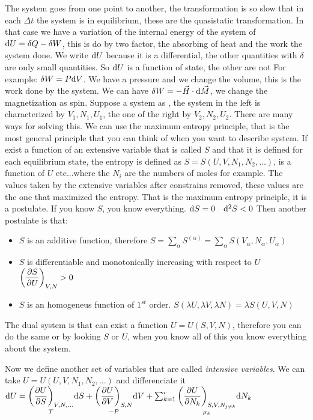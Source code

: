 \documentclass[../main/main.tex]{subfiles}
\begin{document}
The system goes from one point to another, the transformation is so slow that in each $\Delta t$ the system is in equilibrium, these are the quasistatic transformation.  In that case we have a variation of the internal energy of the system of $\mathrm{d} U = \delta Q - \delta W$, this is do by two factor, the absorbing of heat and the work the system done. We write $\mathrm{d} U$ because it is a differential, the other quantities with $\delta$ are only small quantities. So $\mathrm{d} U$ is a function of state, the other are not
For example: $\delta W = P \mathrm{d} V$. We have a pressure and we change the volume, this is the work done by the system. We can have $\delta W = -\vec{H} \cdot \mathrm{d} \vec{M}$, we change the magnetization as spin. 
Suppose a system as , the system in the left is characterized by $V_1,N_1,U_1$, the one of the right by $V_2,N_2,U_2$. There are many ways for solving this. We can use the maximum entropy principle, that is the most general principle that you can think of when you want to describe system. 
If exist a function of an extensive variable that is called $S$ and that it is defined for each equilibrium state, the entropy is defined as $S = S (U,V,N_1,N_2,\dots)$, is a function of $U$ etc...where the $N_i$ are the numbers of moles for example. 
The values taken by the extensive variables after constrains removed, these values are the one that maximized the entropy. That is the maximum entropy principle, it is a postulate.
If you know $S$, you know everything. 
$\mathrm{d} S = 0 \quad \mathrm{d}^2 S < 0 $ 
Then another postulate is that:
\begin{itemize}
\item $S$ is an additive function, therefore $S= \sum_\alpha S^{(\alpha)} =  \sum_\alpha S(V_\alpha,N_\alpha,U_\alpha ) $
\item $S$ is differentiable and monotonically increasing with respect to $U$
$\left( \displaystyle \frac{\partial S}{\partial U} \right)_{V,N} > 0$
\item $S$ is an homogeneus function of $1^{st}$ order.
$S(\lambda U, \lambda V, \lambda N) = \lambda S (U,V,N)$
\end{itemize}

The dual system is that can exist a function $U = U (S,V,N)$, therefore you can do the same or by looking $S$ or $U$, when you know all of this you know everything about the system. 

Now we define another set of variables that are called \textit{intensive variables}. We can take  $U = U (U,V,N_1,N_2,\dots)$ and differenciate it
$\mathrm{d} U = \underset{T}{\left( \displaystyle \frac{\partial U}{\partial S} \right)_{V,N,\dots}} \mathrm{d} S + \underset{-P}{\left( \displaystyle \frac{\partial U}{\partial V} \right)_{S,N}} \mathrm{d} V + \sum_{k=1}^r \underset{\mu_k}{\left( \displaystyle \frac{\partial U}{\partial N_k} \right)_{S,V,N_{j\neq k} }} \mathrm{d} N_k $ 
\end{document}
